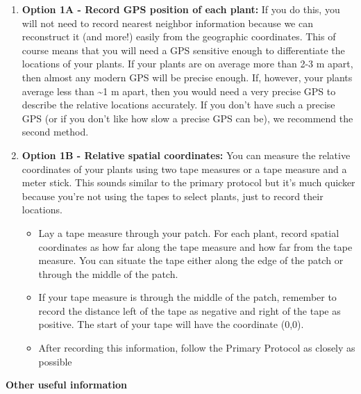 \documentclass[
  letterpaper,
  DIV=11,
  numbers=noendperiod]{scrreprt}
\begin{document}
\begin{enumerate}
\def\labelenumi{\arabic{enumi})}
\item
  \textbf{Option 1A - Record GPS position of each plant: }If you do
  this, you will not need to record nearest neighbor information because
  we can reconstruct it (and more!) easily from the geographic
  coordinates. This of course means that you will need a GPS sensitive
  enough to differentiate the locations of your plants. If your plants
  are on average more than 2-3 m apart, then almost any modern GPS will
  be precise enough. If, however, your plants average less than
  \textasciitilde1 m apart, then you would need a very precise GPS to
  describe the relative locations accurately. If you don't have such a
  precise GPS (or if you don't like how slow a precise GPS can be), we
  recommend the second method.
\item
  \textbf{Option 1B - Relative spatial coordinates: } You can measure
  the relative coordinates of your plants using two tape measures or a
  tape measure and a meter stick. This sounds similar to the primary
  protocol but it's much quicker because you're not using the tapes to
  select plants, just to record their locations.

  \begin{itemize}
  \item
    Lay a tape measure through your patch. For each plant, record
    spatial coordinates as how far along the tape measure and how far
    from the tape measure. You can situate the tape either along the
    edge of the patch or through the middle of the patch.
  \item
    If your tape measure is through the middle of the patch, remember to
    record the distance left of the tape as negative and right of the
    tape as positive. The start of your tape will have the coordinate
    (0,0).
  \item
    After recording this information, follow the Primary Protocol as
    closely as possible
  \end{itemize}
\end{enumerate}

\textbf{Other useful information}
\end{document}
